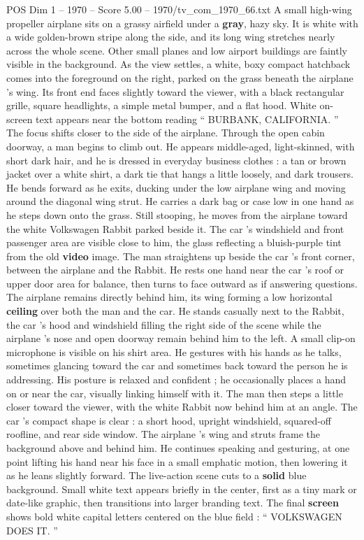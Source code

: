 \begin{textsample}{POS Dim 1 – 1970 – Score 5.00 – 1970/tv\_com\_1970\_66.txt}  \label{ex:f1_pos_069}
A small high-wing propeller airplane sits on a grassy airfield under a \textbf{gray}, hazy sky.
It is white with a wide golden-brown stripe along the side, and its long wing stretches nearly across the whole scene.
Other small planes and low airport buildings are faintly visible in the background.
As the view settles, a white, boxy compact hatchback comes into the foreground on the right, parked on the grass beneath the airplane ’s wing.
Its front end faces slightly toward the viewer, with a black rectangular grille, square headlights, a simple metal bumper, and a flat hood.
White on-screen text appears near the bottom reading “ BURBANK, CALIFORNIA. ” The focus shifts closer to the side of the airplane.
Through the open cabin doorway, a man begins to climb out.
He appears middle-aged, light-skinned, with short dark hair, and he is dressed in everyday business clothes : a tan or brown jacket over a white shirt, a dark tie that hangs a little loosely, and dark trousers.
He bends forward as he exits, ducking under the low airplane wing and moving around the diagonal wing strut.
He carries a dark bag or case low in one hand as he steps down onto the grass.
Still stooping, he moves from the airplane toward the white Volkswagen Rabbit parked beside it.
The car ’s windshield and front passenger area are visible close to him, the glass reflecting a bluish-purple tint from the old \textbf{video} image.
The man straightens up beside the car ’s front corner, between the airplane and the Rabbit.
He rests one hand near the car ’s roof or upper door area for balance, then turns to face outward as if answering questions.
The airplane remains directly behind him, its wing forming a low horizontal \textbf{ceiling} over both the man and the car.
He stands casually next to the Rabbit, the car ’s hood and windshield filling the right side of the scene while the airplane ’s nose and open doorway remain behind him to the left.
A small clip-on microphone is visible on his shirt area.
He gestures with his hands as he talks, sometimes glancing toward the car and sometimes back toward the person he is addressing.
His posture is relaxed and confident ; he occasionally places a hand on or near the car, visually linking himself with it.
The man then steps a little closer toward the viewer, with the white Rabbit now behind him at an angle.
The car ’s compact shape is clear : a short hood, upright windshield, squared-off roofline, and rear side window.
The airplane ’s wing and struts frame the background above and behind him.
He continues speaking and gesturing, at one point lifting his hand near his face in a small emphatic motion, then lowering it as he leans slightly forward.
The live-action scene cuts to a \textbf{solid} blue background.
Small white text appears briefly in the center, first as a tiny mark or date-like graphic, then transitions into larger branding text.
The final \textbf{screen} shows bold white capital letters centered on the blue field : “ VOLKSWAGEN DOES IT. ”

\end{textsample}
